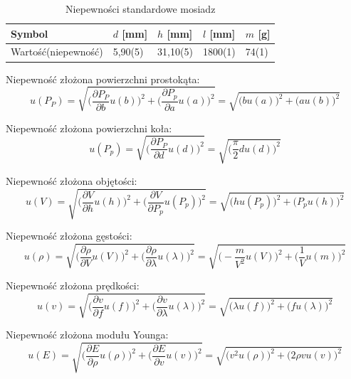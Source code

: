 \documentclass [a4paper,11pt]{article}
\begin{document}
		\begin{table}[h!]
			\centering
			\caption{Niepewności standardowe mosiadz}
			\label{tab:nsmosiadz}
			\begin{tabular}{l|l|l|l|l}
					Symbol & \textit{$d$} [mm]  & \textit{$h$} [mm]   & \textit{$l$} [mm]     & \textit{$m$} [g]   \\ \hline
				Wartość(niepewność)	& 5,90(5)      & 31,10(5) & 1800(1) & 74(1) \\
			\end{tabular}
		\end{table}
	Niepewność złożona powierzchni prostokąta:
		\begin{equation}
		u(P_P)=\sqrt{\bigg(\frac{\partial P_P}{\partial b}u(b)\bigg)^2 + \bigg(\frac{\partial P_p}{\partial a}u(a)\bigg)^2} = \sqrt{\bigg(bu(a)\bigg)^2+\bigg(au(b) \bigg)^2}
			\end{equation}
			
	Niepewność złożona powierzchni koła:
		\begin{equation}
		u(P_p)=\sqrt{\bigg(\frac{\partial P_P}{\partial d}u(d)\bigg)^2} = \sqrt{\bigg(\frac{\pi}{2}du(d)\bigg)^2}
		\end{equation}
		
	Niepewność złożona objętości:
	\begin{equation}
	u(V)=\sqrt{\bigg(\frac{\partial V}{\partial h}u(h)\bigg)^2 + \bigg(\frac{\partial V}{\partial P_p}u(P_p)\bigg)^2} = \sqrt{\bigg(hu(P_p)\bigg)^2+\bigg(P_pu(h) \bigg)^2}
	\end{equation}
	
	Niepewność złożona gęstości:
	\begin{equation}
	u(\rho)=\sqrt{\bigg(\frac{\partial \rho}{\partial V}u(V)\bigg)^2+\bigg(\frac{\partial \rho}{\partial \lambda}u(\lambda)\bigg)^2}=\sqrt{\bigg(-\frac{m}{V^2}u(V)\bigg)^2+\bigg(\frac{1}{V}u(m) \bigg)^2}
	\end{equation}
	
	Niepewność złożona prędkości:
	\begin{equation}
	u(v)=\sqrt{\bigg(\frac{\partial v}{\partial f}u(f)\bigg)^2+\bigg(\frac{\partial v}{\partial \lambda}u(\lambda)\bigg)^2}=\sqrt{\bigg(\lambda u(f)\bigg)^2+\bigg(f u(\lambda)\bigg)^2}
	\end{equation}
	
	Niepewność złożona modułu Younga:
	\begin{equation}
			 u(E)=\sqrt{\bigg(\frac{\partial E}{\partial \rho}u(\rho)\bigg)^2+\bigg(\frac{\partial E}{\partial v}u(v)\bigg)^2} =
	\sqrt{\bigg(v^2 u(\rho)\bigg)^2+\bigg(2 \rho v u(v)\bigg)^2}
	\end{equation}
\end{document}
